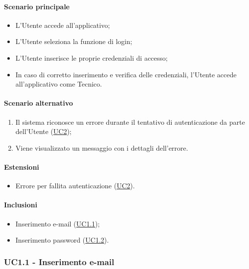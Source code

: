 \paragraph*{Scenario principale}
\begin{itemize}
  \item L’Utente accede all’applicativo;
  \item L’Utente seleziona la funzione di login;
  \item L’Utente inserisce le proprie credenziali di accesso;
  \item In caso di corretto inserimento e verifica delle credenziali, l’Utente accede all’applicativo come Tecnico.
\end{itemize}

\paragraph*{Scenario alternativo}
\begin{enumerate}
  \item Il sistema riconosce un errore durante il tentativo di autenticazione da parte dell'Utente (\hyperref[UC2]{UC2});
  \item Viene visualizzato un messaggio con i dettagli dell'errore.
\end{enumerate}

\paragraph*{Estensioni}
\begin{itemize}
  \item Errore per fallita autenticazione (\hyperref[UC2]{UC2}).
\end{itemize}

\paragraph*{Inclusioni}
\begin{itemize}
  \item Inserimento e-mail (\hyperref[UC1point1]{UC1.1});
  \item Inserimento password (\hyperref[UC1point2]{UC1.2}).
\end{itemize}


\subsubsection{UC1.1 - Inserimento e-mail}\label{UC1point1}

